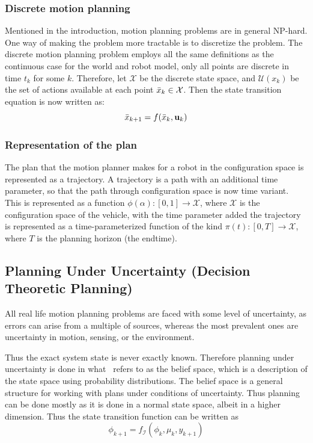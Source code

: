 \subsubsection{Discrete motion planning}

Mentioned in the introduction, motion planning problems are in general NP-hard.
One way of making the problem more tractable is to discretize the problem. The
discrete motion planning problem employs all the same definitions as the
continuous case for the world and robot model, only all points are discrete in
time \(t_k\) for some \(k\). Therefore, let \(\mathcal{X}\) be the discrete
state space, and \(\mathcal{U}(x_k)\) be the set of actions available at each
point \(\bar{x}_k \in \mathcal{X}\). Then the state transition equation is now
written as:
\[
  \bar{x}_{k+1} = f(\bar{x}_k, \mathbf{u}_k)
\]

\subsubsection{Representation of the plan}

The plan that the motion planner makes for a robot in the configuration space is
represented as a trajectory. A trajectory is a path with an additional time
parameter, so that the path through configuration space is now time variant.
This is represented as a function \(\phi(\alpha) \colon [0,1] \rightarrow
\mathcal{X}\), where \(\mathcal{X}\) is the configuration space of the vehicle,
with the time parameter added the trajectory is represented as a
time-parameterized function of the kind \(\pi(t) \colon [0,T] \rightarrow
\mathcal{X}\), where \(T\) is the planning horizon (\ie the endtime).

\subsection{Planning Under Uncertainty (Decision Theoretic Planning)}

All real life motion planning problems are faced with some level of uncertainty,
as errors can arise from a multiple of sources, whereas the most prevalent ones
are uncertainty in motion, sensing, or the environment.

Thus the exact system state is never exactly known. Therefore planning under
uncertainty is done in what~\cite[LaValle]{Lav06} refers to as the belief space,
which is a description of the state space using probability distributions. The
belief space is a general structure for working with plans under conditions of
uncertainty. Thus planning can be done mostly as it is done in a normal state
space, albeit in a higher dimension. Thus the state transition function can be
written as
\[
  \phi_{k+1} = f_{\mathcal{I}}\left( \phi_k, \mu_k, y_{k+1} \right)
\]

